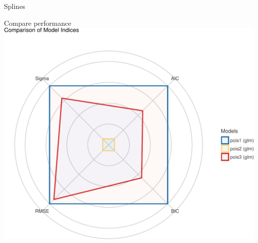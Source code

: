 \documentclass[
  ignorenonframetext,
]{beamer}
\begin{document}
\begin{frame}{Splines}
\begin{block}{Compare performance}
\protect\hypertarget{compare-performance}{}
\includegraphics{slides_files/figure-beamer/unnamed-chunk-39-1.pdf}
\end{block}
\end{frame}
\end{document}
